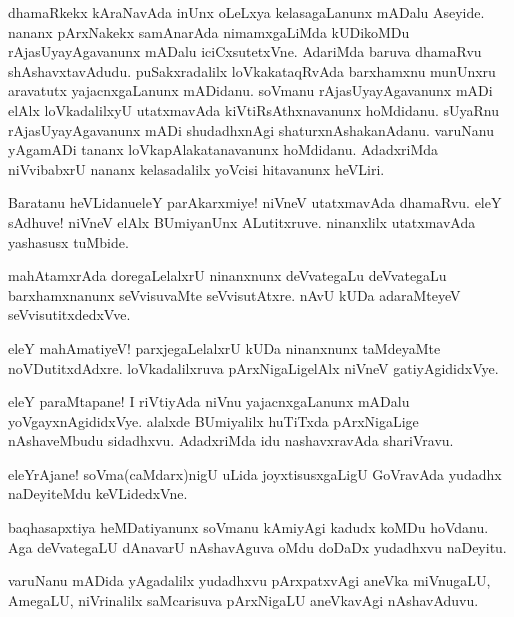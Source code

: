 \begin{mng}
dhamaRkekx kAraNavAda inUnx oLeLxya kelasagaLanunx mADalu Aseyide. nananx pArxNakekx samAnarAda nimamxgaLiMda kUDikoMDu rAjasUyayAgavanunx mADalu iciCxsutetxVne. AdariMda baruva dhamaRvu shAshavxtavAdudu. puSakxradalilx loVkakataqRvAda barxhamxnu munUnxru aravatutx yajacnxgaLanunx mADidanu. soVmanu rAjasUyayAgavanunx mADi elAlx loVkadalilxyU utatxmavAda kiVtiRsAthxnavanunx hoMdidanu. sUyaRnu rAjasUyayAgavanunx mADi shudadhxnAgi shaturxnAshakanAdanu. varuNanu yAgamADi tananx loVkapAlakatanavanunx hoMdidanu. AdadxriMda niVvibabxrU nananx kelasadalilx yoVcisi hitavanunx heVLiri.
\end{mng}

\begin{mng}
Baratanu heVLidanu\mdash eleY parAkarxmiye! niVneV utatxmavAda dhamaRvu. eleY sAdhuve! niVneV elAlx BUmiyanUnx ALutitxruve. ninanxlilx utatxmavAda yashasusx tuMbide.
\end{mng}

\begin{mng}
mahAtamxrAda doregaLelalxrU ninanxnunx deVvategaLu deVvategaLu barxhamxnanunx seVvisuvaMte seVvisutAtxre. nAvU kUDa adaraMteyeV seVvisutitxdedxVve.
\end{mng}

\begin{mng}
eleY mahAmatiyeV! parxjegaLelalxrU kUDa ninanxnunx taMdeyaMte noVDutitxdAdxre. loVkadalilxruva pArxNigaLigelAlx niVneV gatiyAgididxVye.
\end{mng}

\begin{mng}
eleY paraMtapane! I riVtiyAda niVnu yajacnxgaLanunx mADalu yoVgayxnAgididxVye. alalxde BUmiyalilx huTiTxda pArxNigaLige nAshaveMbudu sidadhxvu. AdadxriMda idu nashavxravAda shariVravu.
\end{mng}

\begin{mng}
eleYrAjane! soVma(caMdarx)nigU uLida joyxtisusxgaLigU GoVravAda yudadhx naDeyiteMdu keVLidedxVne.
\end{mng}

\begin{mng}
baqhasapxtiya heMDatiyanunx soVmanu kAmiyAgi kadudx koMDu hoVdanu. Aga deVvategaLU dAnavarU nAshavAguva oMdu doDaDx yudadhxvu naDeyitu.
\end{mng}

\begin{mng}
varuNanu mADida yAgadalilx yudadhxvu pArxpatxvAgi aneVka miVnugaLU, AmegaLU, niVrinalilx saMcarisuva pArxNigaLU aneVkavAgi nAshavAduvu.
\end{mng}

